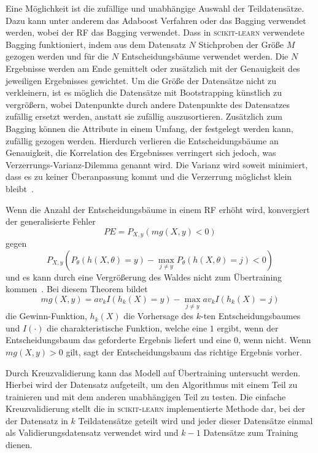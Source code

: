 Eine Möglichkeit ist die zufällige und unabhängige Auswahl der Teildatensätze.
Dazu kann unter anderem das Adaboost Verfahren oder das Bagging verwendet werden, wobei der RF das Bagging verwendet.
Dass in \textsc{scikit-learn} verwendete Bagging funktioniert, indem aus dem Datensatz $N$ Stichproben der Größe $M$ gezogen werden und für die $N$ Entscheidungsbäume verwendet werden.
Die $N$ Ergebnisse werden am Ende gemittelt oder zusätzlich mit der Genauigkeit des jeweiligen Ergebnisses gewichtet.
Um die Größe der Datensätze nicht zu verkleinern, ist es möglich die Datensätze mit Bootstrapping künstlich zu vergrößern, wobei Datenpunkte durch andere Datenpunkte
des Datensatzes zufällig ersetzt werden, anstatt sie zufällig auszusortieren.
Zusätzlich zum Bagging können die Attribute in einem Umfang, der festgelegt werden kann, zufällig gezogen werden.
Hierdurch verlieren die Entscheidungsbäume an Genauigkeit, die Korrelation des Ergebnisses verringert sich jedoch,
was Verzerrungs-Varianz-Dilemma genannt wird. Die Varianz wird soweit minimiert, dass es zu keiner Überanpassung kommt
und die Verzerrung möglichst klein bleibt~\cite[2]{Hyperparameter_RF}.

Wenn die Anzahl der Entscheidungsbäume in einem RF erhöht wird, konvergiert der generalisierte Fehler
\begin{equation}
  PE = P_{X,y}(mg(X,y)<0)
\end{equation}
gegen
\begin{equation}
  P_{X,y}(P_\theta(h(X,\theta)=y)-\max_{j\neq y}P_\theta(h(X,\theta)=j)<0)
\end{equation}
und es kann durch eine Vergrößerung des Waldes nicht zum Übertraining kommen~\cite[7]{RandomForests_Breiman}. Bei diesem Theorem bildet
\begin{equation}
  mg(X,y) = av_k I(h_k(X)=y) - \max_{j \neq y}av_k I(h_k(X)=j)
\end{equation}
die Gewinn-Funktion, $h_k(X)$ die Vorhersage des $k$-ten Entscheidungsbaumes und $I(\cdot)$ die charakteristische Funktion, welche eine $1$ ergibt, wenn der
Entscheidungsbaum das geforderte Ergebnis liefert und eine $0$, wenn nicht.
Wenn $mg(X,y) > 0$ gilt, sagt der Entscheidungsbaum das richtige Ergebnis vorher.



Durch Kreuzvalidierung kann das Modell auf Übertraining untersucht werden. Hierbei wird der Datensatz aufgeteilt, um
den Algorithmus mit einem Teil zu trainieren und mit dem anderen unabhängigen Teil zu testen.
Die einfache Kreuzvalidierung stellt die in \textsc{scikit-learn} implementierte Methode dar, bei der der Datensatz
in $k$ Teildatensätze geteilt wird und jeder dieser Datensätze einmal als Validierungsdatensatz
verwendet wird und $k-1$ Datensätze zum Training dienen.

